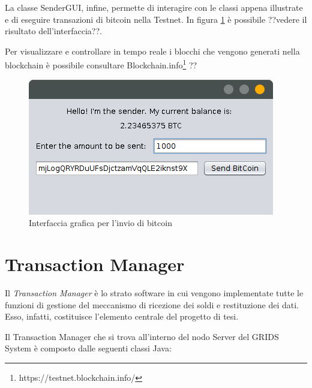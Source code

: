 La classe SenderGUI, infine, permette di interagire con le classi appena illustrate e di eseguire transazioni di bitcoin nella Testnet. In figura \ref{f:integr:gui-base} è possibile ??vedere il risultato dell'interfaccia??.

Per visualizzare e controllare in tempo reale i blocchi che vengono generati nella blockchain è possibile consultare Blockchain.info\footnote{https://testnet.blockchain.info/} ??

\begin{figure}[h!t]
\centerline{\includegraphics[width=\textwidth]{img/gui-base}}
\caption{Interfaccia grafica per l'invio di bitcoin}
\label{f:integr:gui-base}
\end{figure}


\section{Transaction Manager}
\label{c:integr:trxmanager}

Il \textit{Transaction Manager} è lo strato software in cui vengono implementate tutte le funzioni di gestione del meccanismo di ricezione dei soldi e restituzione dei dati. Esso, infatti, costituisce l'elemento centrale del progetto di tesi.

Il Transaction Manager che si trova all'interno del nodo Server del GRIDS System è composto dalle seguenti classi Java:


